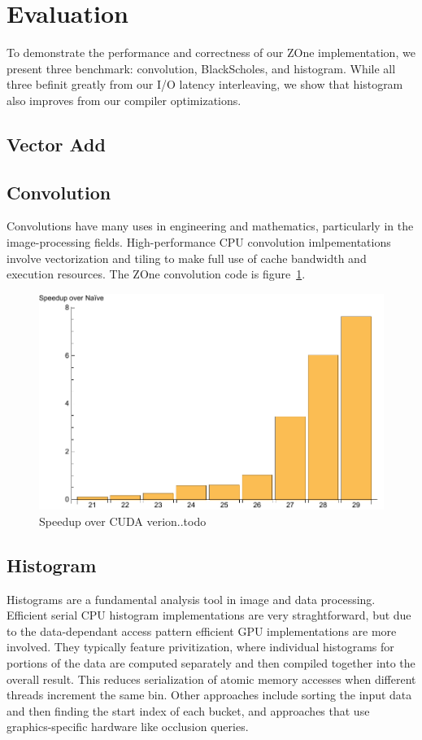 \section{Evaluation}

To demonstrate the performance and correctness of our ZOne implementation, we
present three benchmark: convolution, BlackScholes, and histogram.
While all three befinit greatly from our I/O latency interleaving, we show
	that histogram also improves from our compiler optimizations.


\subsection{Vector Add}

\subsection{Convolution}
Convolutions have many uses in engineering and mathematics, particularly in
the image-processing fields. High-performance CPU convolution imlpementations
involve vectorization and tiling to make full use of cache bandwidth and 
execution resources. The ZOne convolution code is figure~\ref{fig:stencil}.

\begin{figure}
\centering
\includegraphics[scale=0.5]{data/stencil.pdf}
\caption{Speedup over CUDA verion..todo}
\label{fig:stencil}
\centering
\end{figure}


\subsection{Histogram}
Histograms are a fundamental analysis tool in image and data processing.
Efficient serial CPU histogram implementations are very straghtforward, but
due to the data-dependant access pattern efficient GPU implementations are
more involved. They typically feature privitization,
where individual histograms for portions of the data are computed separately
and then compiled together into the overall result. This reduces serialization
of atomic memory accesses when different threads increment the same bin.
Other approaches include sorting the input data and then finding the start
index of each bucket, and approaches that use graphics-specific hardware like
occlusion queries.

